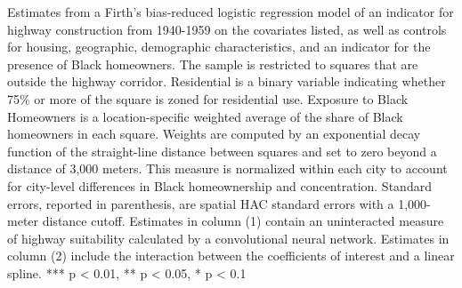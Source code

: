\begin{table}[h]
\begin{threeparttable}
\begin{tablenotes}[flushleft]
\item Estimates from a Firth's bias-reduced logistic regression model of an indicator for highway construction from 1940-1959 on the covariates listed, as well as controls for housing, geographic, demographic characteristics, and an indicator for the presence of Black homeowners. The sample is restricted to squares that are outside the highway corridor. Residential is a binary variable indicating whether 75\% or more of the square is zoned for residential use. Exposure to Black Homeowners is a location-specific weighted average of the share of Black homeowners in each square. Weights are computed by an exponential decay function of the straight-line distance between squares and set to zero beyond a distance of 3,000 meters. This measure is normalized within each city to account for city-level differences in Black homeownership and concentration. Standard errors, reported in parenthesis, are \textcite{conley_gmm_1999} spatial HAC standard errors with a 1,000-meter distance cutoff. Estimates in column (1) contain an uninteracted measure of highway suitability calculated by a convolutional neural network. Estimates in column (2) include the interaction between the coefficients of interest and a linear spline. *** p < 0.01, ** p < 0.05, * p < 0.1
\end{tablenotes}
\end{threeparttable}
\end{table}
